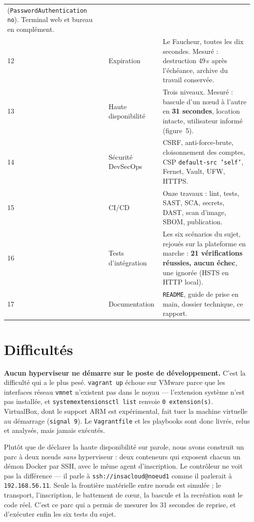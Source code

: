 \documentclass[11pt,a4paper]{article}
\begin{document}
{\begin{tabularx}{\textwidth}{@{}p{0.45cm}p{3.5cm}>{\raggedright\arraybackslash}X@{}}
(\texttt{PasswordAuthentication no}). Terminal web et bureau en complément. \\
12 & Expiration & Le Faucheur, toutes les dix secondes. Mesuré : destruction 49\,s après
l'échéance, archive du travail conservée. \\
13 & Haute disponibilité & Trois niveaux. Mesuré : bascule d'un n\oe{}ud à l'autre en
\textbf{31 secondes}, location intacte, utilisateur informé (figure~5). \\
14 & Sécurité DevSecOps & CSRF, anti-force-brute, cloisonnement des comptes, CSP
\texttt{default-src 'self'}, Fernet, Vault, UFW, HTTPS. \\
15 & CI/CD & Onze travaux : lint, tests, SAST, SCA, secrets, DAST, scan d'image, SBOM,
publication. \\
16 & Tests d'intégration & Les six scénarios du sujet, rejoués sur la plateforme en marche :
\textbf{21 vérifications réussies, aucun échec}, une ignorée (HSTS en HTTP local). \\
17 & Documentation & \texttt{README}, guide de prise en main, dossier technique, ce rapport. \\
\bottomrule
\end{tabularx}}

\section{Difficultés}

\textbf{Aucun hyperviseur ne démarre sur le poste de développement.} C'est la difficulté qui a
le plus pesé. \texttt{vagrant up} échoue sur VMware parce que les interfaces réseau
\texttt{vmnet} n'existent pas dans le noyau --- l'extension système n'est pas installée, et
\texttt{systemextensionsctl list} renvoie \texttt{0 extension(s)}. VirtualBox, dont le support ARM
est expérimental, fait tuer la machine virtuelle au démarrage (\texttt{signal 9}). Le
\texttt{Vagrantfile} et les playbooks sont donc livrés, relus et analysés, mais jamais exécutés.

Plutôt que de déclarer la haute disponibilité sur parole, nous avons construit un parc à deux
n\oe{}uds \emph{sans} hyperviseur : deux conteneurs qui exposent chacun un démon Docker par SSH,
avec le même agent d'inscription. Le contrôleur ne voit pas la différence --- il parle à
\texttt{ssh://insacloud@noeud1} comme il parlerait à \texttt{192.168.56.11}. Seule la frontière
matérielle entre n\oe{}uds est simulée ; le transport, l'inscription, le battement de c\oe{}ur, la
bascule et la recréation sont le code réel. C'est ce parc qui a permis de mesurer les 31 secondes
de reprise, et d'exécuter enfin les six tests du sujet.
\end{document}

